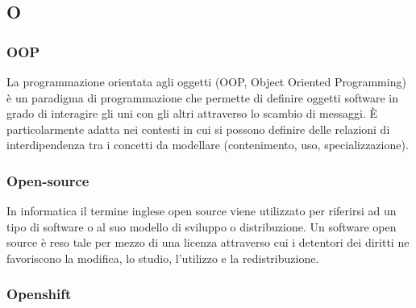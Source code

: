 \subsection*{\textbf{\hfill \Huge{O} \hfill}} 
\subsubsection*{OOP}
La programmazione orientata agli oggetti (OOP, Object Oriented Programming) è un paradigma di programmazione che permette di definire oggetti software in grado di interagire gli uni con gli altri attraverso lo scambio di messaggi. È particolarmente adatta nei contesti in cui si possono definire delle relazioni di interdipendenza tra i concetti da modellare (contenimento, uso, specializzazione).
\subsubsection*{Open-source}
In informatica il termine inglese open source viene utilizzato per riferirsi ad un tipo di software o al suo modello di sviluppo o distribuzione. Un software open source è reso tale per mezzo di una licenza attraverso cui i detentori dei diritti ne favoriscono la modifica, lo studio, l'utilizzo e la redistribuzione.
\subsubsection*{Openshift}

